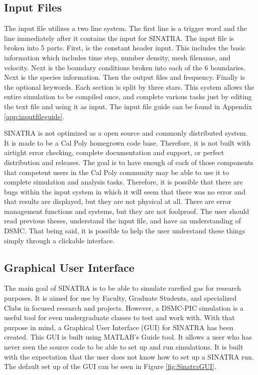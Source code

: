 \subsection{Input Files}
The input file utilizes a two line system. The first line is a trigger word and the line immediately after it contains the input for SINATRA. The input file is broken into 5 parts. First, is the constant header input. This includes the basic information which includes time step, number density, mesh filename, and velocity. Next is the boundary conditions broken into each of the 6 boundaries. Next is the species information. Then the output files and frequency. Finally is the optional keywords. Each section is split by three stars. This system allows the entire simulation to be compiled once, and complete various tasks just by editing the text file and using it as input. The input file guide can be found in Appendix \ref{app:inputfileguide}. \par
\indent SINATRA is not optimized as a open source and commonly distributed system. It is made to be a Cal Poly homegrown code base. Therefore, it is not built with airtight error checking, complete documentation and support, or perfect distribution and releases. The goal is to have enough of each of those components that competent users in the Cal Poly community may be able to use it to complete simulation and analysis tasks. Therefore, it is possible that there are bugs within the input system in which it will seem that there was no error and that results are displayed, but they are not physical at all. There are error management functions and systems, but they are not foolproof. The user should read previous theses, understand the input file, and have an understanding of DSMC. That being said, it is possible to help the user understand these things simply through a clickable interface. 

\subsection{Graphical User Interface}
The main goal of SINATRA is to be able to simulate rarefied gas for research purposes. It is aimed for use by Faculty, Graduate Students, and specialized Clubs in focused research and projects. However, a DSMC-PIC simulation is a useful tool for even undergraduate classes to test and work with. With that purpose in mind, a Graphical User Interface (GUI) for SINATRA has been created. This GUI is built using MATLAB's Guide tool. It allows a user who has never seen the source code to be able to set up and run simulations. It is built with the expectation that the user does not know how to set up a SINATRA run. The default set up of the GUI can be seen in Figure \ref{fig:SinatraGUI}. \par

